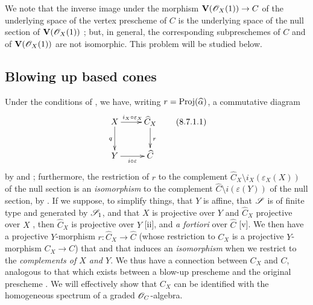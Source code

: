 We note that the inverse image under the morphism $\bb{V}(\sh{O}_X(1))\to C$ of the underlying space of the vertex prescheme of $C$ is the underlying space of the null section of $\mathbf{V}(\mathscr{O}_X(1))$ ;
but, in general, the corresponding subpreschemes of $C$ and of $\mathbf{V}(\mathscr{O}_X(1))$ are not isomorphic.
This problem will be studied below.


\subsection{Blowing up based cones}
\label{subsection:II.8.7}

\begin{env}[8.7.1]
\label{II.8.7.1}
Under the conditions of , we have, writing $r=\operatorname{Proj}(\widehat{\alpha})$, a commutative diagram
\[
\label{II.8.7.1.1}
  \xymatrix{
    X
      \ar[r]^{i_X\circ\varepsilon_X}
      \ar[d]_{q}
  & \widehat{C}_X
      \ar[d]^{r}
  \\Y
      \ar[r]_{i\circ\varepsilon}
  & \widehat{C}
  }
\tag{8.7.1.1}
\]
by  and ;
furthermore, the restriction of $r$ to the complement $\widehat{C}_X\setminus i_X(\varepsilon_X(X))$ of the null section is an \emph{isomorphism} to the complement $\widehat{C}\setminus i(\varepsilon(Y))$ of the null section, by .
If we suppose, to simplify things, that $Y$ is affine, that $\mathscr{S}$ is of finite type and generated by $\mathscr{S}_1$, and that $X$ is projective over $Y$ and $\widehat{C}_X$ projective over $X$ , then $\widehat{C}_X$ is projective over $Y$ [ii], and \emph{a fortiori} over $\widehat{C}$ [v].
We then have a projective $Y$-morphism $r:\widehat{C}_X\to\widehat{C}$ (whose restriction to $C_X$ is a projective $Y$-morphism $C_X\to C$) that  and that induces an \emph{isomorphism} when we restrict to the \emph{complements of $X$ and $Y$}.
We thus have a connection between $C_X$ and $C$, analogous to that which exists between a blow-up prescheme and the original prescheme .
We will effectively show that $C_X$ can be identified with the homogeneous spectrum of a graded $\mathscr{O}_C$-algebra.
\end{env}

